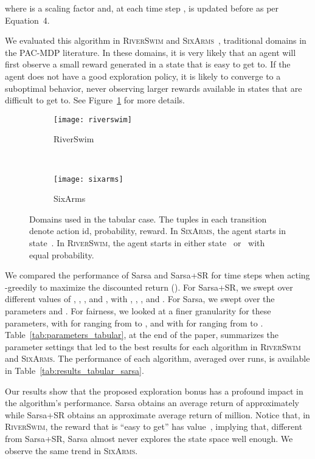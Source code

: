 \documentclass[letterpaper]{article} \usepackage{aaai20}  \usepackage{times}  \usepackage{helvet} \usepackage{courier}  \usepackage[hyphens]{url}  \usepackage{graphicx} \urlstyle{rm} \def\UrlFont{\rm}  \usepackage{graphicx}  \frenchspacing  \setlength{\pdfpagewidth}{8.5in}  \setlength{\pdfpageheight}{11in}  \usepackage{booktabs}
\begin{document}
where  is a scaling factor and, at each time step ,  is updated before  as per Equation~4.

We evaluated this algorithm in \textsc{RiverSwim} and \textsc{SixArms}~\cite{Strehl08}, traditional domains in the PAC-MDP literature. In these domains, it is very likely that an agent will first observe a small reward generated in a state that is easy to get to. If the agent does not have a good exploration policy, it is likely to converge to a suboptimal behavior, never observing larger rewards available in states that are difficult to get to. See Figure~\ref{fig:tabular_domains} for more details. 

\begin{figure}[t]
    \centering
    \begin{subfigure}[b]{0.45\textwidth}
        \texttt{[image: riverswim]}
        \caption{RiverSwim \linebreak}
    \end{subfigure}
    ~ 

    \begin{subfigure}[b]{0.42\textwidth}
        \texttt{[image: sixarms]}
        \caption{SixArms}
    \end{subfigure}
    \caption{Domains used in the tabular case. The tuples in each transition denote action id, probability, reward. In \textsc{SixArms}, the agent starts in state~. In \textsc{RiverSwim}, the agent starts in either state~ or~ with equal probability.} \label{fig:tabular_domains} 
\end{figure}


We compared the performance of Sarsa and Sarsa+SR for  time steps when acting -greedily to maximize the discounted return (). For Sarsa+SR, we swept over different values of , , ,  and , with , , ,  and . For Sarsa, we swept over the parameters  and . For fairness, we looked at a finer granularity for these parameters, with  for  ranging from  to , and with  for  ranging from  to . Table~\ref{tab:parameters_tabular}, at the end of the paper, summarizes the parameter settings that led to the best results for each algorithm in \textsc{RiverSwim} and \textsc{SixArms}. The performance of each algorithm, averaged over  runs, is available in Table~\ref{tab:results_tabular_sarsa}.

Our results show that the proposed exploration bonus has a profound impact in the algorithm's performance. Sarsa obtains an average return of approximately  while Sarsa+SR obtains an approximate average return of  million. Notice that, in \textsc{RiverSwim}, the reward that is ``easy to get'' has value~, implying that, different from Sarsa+SR, Sarsa almost never explores the state space well enough. We observe the same trend in \textsc{SixArms}.
\end{document}
